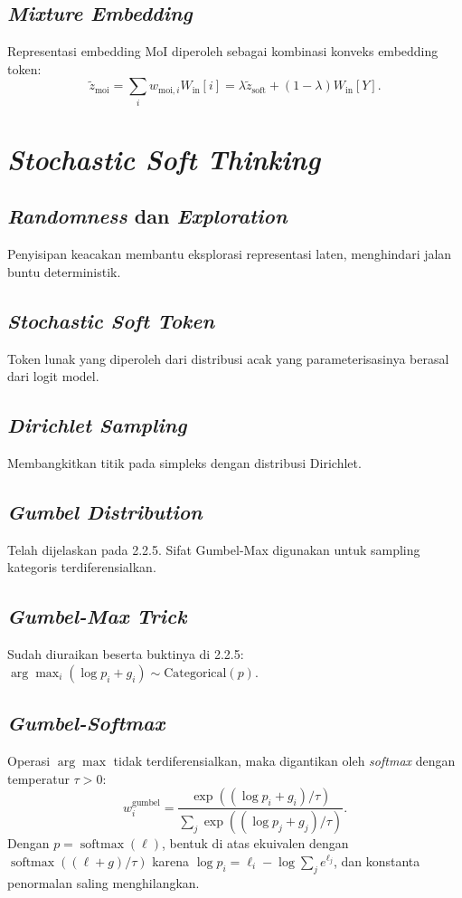 \subsection{\textit{Mixture Embedding}}
Representasi embedding MoI diperoleh sebagai kombinasi konveks embedding token:
\begin{equation}
\tilde z_{\mathrm{moi}} = \sum_i w_{\mathrm{moi},i} W_{\mathrm{in}}[i] = \lambda \tilde z_{\mathrm{soft}} + (1-\lambda) W_{\mathrm{in}}[Y].
\tag{2.2}
\end{equation}

\section{\textit{Stochastic Soft Thinking}}

\subsection{\textit{Randomness} dan \textit{Exploration}}
Penyisipan keacakan membantu eksplorasi representasi laten, menghindari jalan buntu deterministik.

\subsection{\textit{Stochastic Soft Token}}
Token lunak yang diperoleh dari distribusi acak yang parameterisasinya berasal dari logit model.

\subsection{\textit{Dirichlet Sampling}}
Membangkitkan titik pada simpleks dengan distribusi Dirichlet.

\subsection{\textit{Gumbel Distribution}}
Telah dijelaskan pada 2.2.5. Sifat Gumbel-Max digunakan untuk sampling kategoris terdiferensialkan.

\subsection{\textit{Gumbel-Max Trick}}
Sudah diuraikan beserta buktinya di 2.2.5: \(\arg\max_i(\log p_i + g_i) \sim \text{Categorical}(p)\).

\subsection{\textit{Gumbel-Softmax}}
Operasi \(\arg\max\) tidak terdiferensialkan, maka digantikan oleh \textit{softmax} dengan temperatur \(\tau>0\):
\begin{equation}
w_i^{\mathrm{gumbel}} = \frac{\exp((\log p_i + g_i)/\tau)}{\sum_j \exp((\log p_j + g_j)/\tau)}.
\tag{2.3}
\end{equation}
Dengan \(p = \operatorname{softmax}(\ell)\), bentuk di atas ekuivalen dengan \(\operatorname{softmax}((\ell + g)/\tau)\) karena \(\log p_i = \ell_i - \log\sum_j e^{\ell_j}\), dan konstanta penormalan saling menghilangkan.

